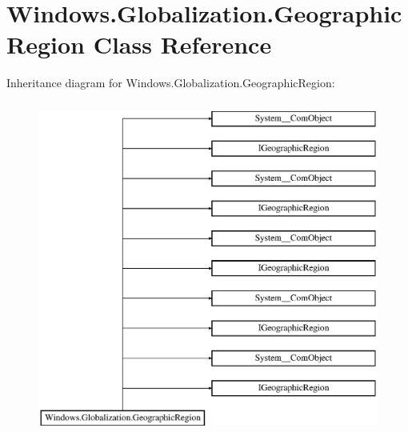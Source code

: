 \hypertarget{class_windows_1_1_globalization_1_1_geographic_region}{}\section{Windows.\+Globalization.\+Geographic\+Region Class Reference}
\label{class_windows_1_1_globalization_1_1_geographic_region}
Inheritance diagram for Windows.\+Globalization.\+Geographic\+Region\+:\begin{figure}[H]
\begin{center}
\leavevmode
\includegraphics[height=11.000000cm]{class_windows_1_1_globalization_1_1_geographic_region}
\end{center}
\end{figure}
